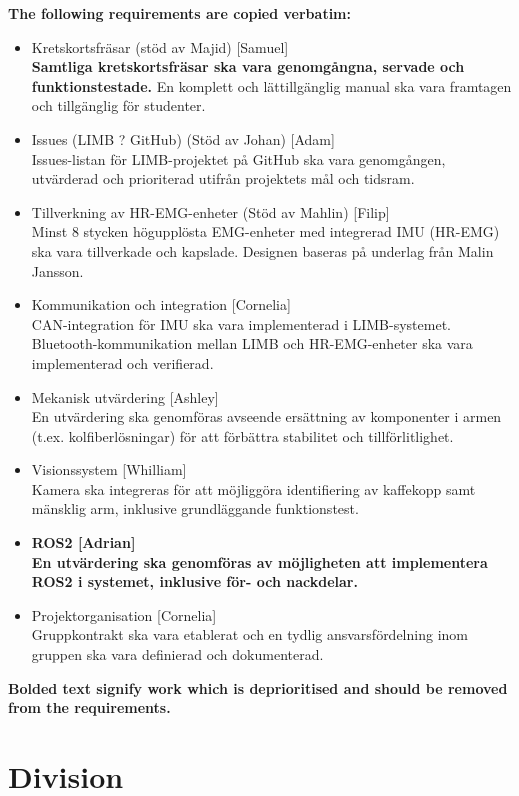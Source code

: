 \textbf{The following requirements are copied verbatim:}
\begin{itemize}
  \item Kretskortsfräsar (stöd av Majid) [Samuel]\\
\textbf{Samtliga kretskortsfräsar ska vara genomgångna, servade och funktionstestade.} En komplett och lättillgänglig manual ska vara framtagen och tillgänglig för studenter.
  \item Issues (LIMB ? GitHub) (Stöd av Johan) [Adam]\\
Issues-listan för LIMB-projektet på GitHub ska vara genomgången, utvärderad och prioriterad utifrån projektets mål och tidsram.
  \item Tillverkning av HR-EMG-enheter (Stöd av Mahlin) [Filip]\\
Minst 8 stycken högupplösta EMG-enheter med integrerad IMU (HR-EMG) ska vara tillverkade och kapslade. Designen baseras på underlag från Malin Jansson.
  \item Kommunikation och integration [Cornelia]\\
CAN-integration för IMU ska vara implementerad i LIMB-systemet.
Bluetooth-kommunikation mellan LIMB och HR-EMG-enheter ska vara implementerad och verifierad.
  \item Mekanisk utvärdering [Ashley]\\
En utvärdering ska genomföras avseende ersättning av komponenter i armen (t.ex. kolfiberlösningar) för att förbättra stabilitet och tillförlitlighet.
  \item Visionssystem [Whilliam]\\
Kamera ska integreras för att möjliggöra identifiering av kaffekopp samt mänsklig arm, inklusive grundläggande funktionstest.
  \item \textbf{ROS2 [Adrian]\\
En utvärdering ska genomföras av möjligheten att implementera ROS2 i systemet, inklusive för- och nackdelar.}
  \item Projektorganisation [Cornelia]\\
Gruppkontrakt ska vara etablerat och en tydlig ansvarsfördelning inom gruppen ska vara definierad och dokumenterad.
\end{itemize}
\textbf{Bolded text signify work which is deprioritised and should be removed from the requirements.}

\section*{Division} %

